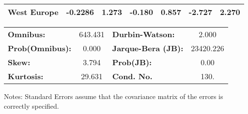 \documentclass[ 11pt]{article}
\begin{document}
\begin{center}
\begin{tabular}{lcccccc}
\textbf{West Europe}  &      -0.2286  &        1.273     &    -0.180  &         0.857        &       -2.727    &        2.270     \\
\bottomrule
\end{tabular}
\begin{tabular}{lclc}
\textbf{Omnibus:}       & 643.431 & \textbf{  Durbin-Watson:     } &     2.000  \\
\textbf{Prob(Omnibus):} &   0.000 & \textbf{  Jarque-Bera (JB):  } & 23420.226  \\
\textbf{Skew:}          &   3.794 & \textbf{  Prob(JB):          } &      0.00  \\
\textbf{Kurtosis:}      &  29.631 & \textbf{  Cond. No.          } &      130.  \\
\bottomrule
\end{tabular}
\end{center}

Notes: \newline
 [1] Standard Errors assume that the covariance matrix of the errors is correctly specified.
 
\end{document}
